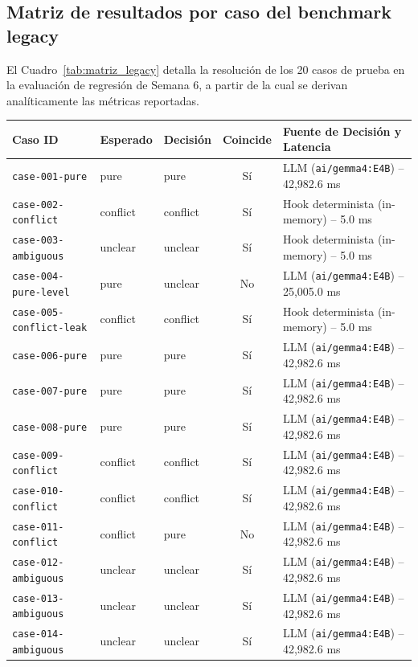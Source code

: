 \documentclass[11pt,a4paper]{article}
\begin{document}
\subsection{Matriz de resultados por caso del benchmark legacy}
El Cuadro~\ref{tab:matriz_legacy} detalla la resolución de los 20 casos de prueba en la evaluación de regresión de Semana 6, a partir de la cual se derivan analíticamente las métricas reportadas.

\begin{table}[H]
\centering
\footnotesize
\begin{tabularx}{\textwidth}{lllcX}
\toprule
\textbf{Caso ID} & \textbf{Esperado} & \textbf{Decisión} & \textbf{Coincide} & \textbf{Fuente de Decisión y Latencia} \\
\midrule
\texttt{case-001-pure} & pure & pure & Sí & LLM (\texttt{ai/gemma4:E4B}) -- 42,982.6 ms \\
\texttt{case-002-conflict} & conflict & conflict & Sí & Hook determinista (in-memory) -- 5.0 ms \\
\texttt{case-003-ambiguous} & unclear & unclear & Sí & Hook determinista (in-memory) -- 5.0 ms \\
\texttt{case-004-pure-level} & pure & unclear & No & LLM (\texttt{ai/gemma4:E4B}) -- 25,005.0 ms \\
\texttt{case-005-conflict-leak} & conflict & conflict & Sí & Hook determinista (in-memory) -- 5.0 ms \\
\texttt{case-006-pure} & pure & pure & Sí & LLM (\texttt{ai/gemma4:E4B}) -- 42,982.6 ms \\
\texttt{case-007-pure} & pure & pure & Sí & LLM (\texttt{ai/gemma4:E4B}) -- 42,982.6 ms \\
\texttt{case-008-pure} & pure & pure & Sí & LLM (\texttt{ai/gemma4:E4B}) -- 42,982.6 ms \\
\texttt{case-009-conflict} & conflict & conflict & Sí & LLM (\texttt{ai/gemma4:E4B}) -- 42,982.6 ms \\
\texttt{case-010-conflict} & conflict & conflict & Sí & LLM (\texttt{ai/gemma4:E4B}) -- 42,982.6 ms \\
\texttt{case-011-conflict} & conflict & pure & No & LLM (\texttt{ai/gemma4:E4B}) -- 42,982.6 ms \\
\texttt{case-012-ambiguous} & unclear & unclear & Sí & LLM (\texttt{ai/gemma4:E4B}) -- 42,982.6 ms \\
\texttt{case-013-ambiguous} & unclear & unclear & Sí & LLM (\texttt{ai/gemma4:E4B}) -- 42,982.6 ms \\
\texttt{case-014-ambiguous} & unclear & unclear & Sí & LLM (\texttt{ai/gemma4:E4B}) -- 42,982.6 ms \\

\end{tabularx}
\end{table}
\end{document}
